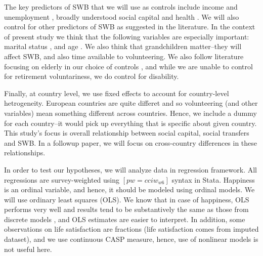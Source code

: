 \documentclass[10pt, letterpaper]{article}
\begin{document}
\begin{spacing}{1.4}
The key predictors of SWB that we will use as controls include income and
unemployment \citep[][]{ditella01moa,ditella01mob,ditella06m}, broadly
understood social
capital and health \citep{blanchflower11,dolan08al,bonsang12}. %
We will also control for other predictors of SWB as suggested in the 
literature. In the context of present study we think that the following
variables are especially important: marital status
\citep[e.g.,][]{myers00,diener04s}, and age \citep{ferring10}. We also think
that grandchildren matter--they will affect SWB, and also time available to volunteering.
%
We also follow literature focusing on elderly in our choice of controls
\citep[e.g.,][]{meier2008volunteering,bonsang12,bender12,ferring10}, and while
we are unable to control for retirement voluntariness, we do control for
disability.

Finally, at country level, we use fixed effects to account for country-level
hetrogeneity.
European countries are quite differet and so volunteering (and other variables) mean something
different across countries.  Hence, we include a dummy for each country--it would pick up
everything that is specific about given country. This study's focus is overall
relationship between social capital, social transfers and SWB. In a followup
paper, we will focus on cross-country differences in these relationships. 


In order to test our hypotheses, we will analyze data in regression framework. 
 All regressions are survey-weighted using $[pw=cciw_{w6}]$ syntax in Stata.
Happiness is an ordinal variable, and hence, it should be modeled using ordinal
models. We will use ordinary least squares (OLS). We know that
in case of happiness, OLS performs very well and results tend to be substantively
the same as those from discrete models \citep{carbonell04,blanchflower11}, and
OLS estimates are easier to interpret.  In addition, some observations on life
satisfaction are fractions (life satisfaction comes from imputed dataset), and
we use continuous CASP measure, hence, use of nonlinear models is not useful
here. 



\end{spacing}
\end{document}
